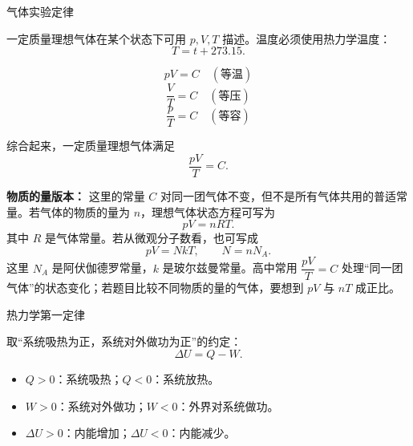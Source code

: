 \begin{conceptbox}{气体实验定律}

一定质量理想气体在某个状态下可用 $p,V,T$ 描述。温度必须使用热力学温度：
\[
T=t+273.15.
\]

\begin{center}


\label{fig:gas-laws-graphs}
\end{center}

\[
\boxed{pV=C\quad(\text{等温})}
\]
\[
\boxed{\frac{V}{T}=C\quad(\text{等压})}
\]
\[
\boxed{\frac{p}{T}=C\quad(\text{等容})}
\]

综合起来，一定质量理想气体满足
\[
\boxed{\frac{pV}{T}=C}.
\]

\textbf{物质的量版本：} 这里的常量 $C$ 对同一团气体不变，但不是所有气体共用的普适常量。若气体的物质的量为 $n$，理想气体状态方程可写为
\[
\boxed{pV=nRT}.
\]
其中 $R$ 是气体常量。若从微观分子数看，也可写成
\[
\boxed{pV=NkT},\qquad N=nN_A.
\]
这里 $N_A$ 是阿伏伽德罗常量，$k$ 是玻尔兹曼常量。高中常用 $\dfrac{pV}{T}=C$ 处理“同一团气体”的状态变化；若题目比较不同物质的量的气体，要想到 $pV$ 与 $nT$ 成正比。

\begin{center}


\label{fig:ideal-gas-mole-bridge}
\end{center}
\end{conceptbox}

\begin{conceptbox}{热力学第一定律}

取“系统吸热为正，系统对外做功为正”的约定：
\[
\boxed{\Delta U=Q-W}.
\]

\begin{center}


\label{fig:first-law-piston}
\end{center}

\begin{itemize}
  \item $Q>0$：系统吸热；$Q<0$：系统放热。
  \item $W>0$：系统对外做功；$W<0$：外界对系统做功。
  \item $\Delta U>0$：内能增加；$\Delta U<0$：内能减少。
\end{itemize}
\end{conceptbox}

